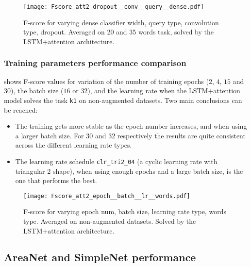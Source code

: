 \begin{figure*}[t!]
    \centering
    \texttt{[image: Fscore\_att2\_dropout\_\_conv\_\_query\_\_dense.pdf]}
    \caption{F-score for varying
        dense classifier width,
        query type,
        convolution type,
        dropout.
        Averaged on 20 and 35 words task, solved by the LSTM+attention architecture.
        }%
    \label{fig:att_dropout_conv_query_dense}
\end{figure*}

\subsubsection{Training parameters performance comparison}


 shows F-score values for 
variation of 
the number of training epochs ($2$, $4$, $15$ and $30$),
the batch size ($16$ or $32$),
and the learning rate
when the LSTM+attention model solves the task \texttt{k1}
on non-augmented datasets.
Two main conclusions can be reached:
\begin{itemize}
    \item
        The training gets more stable as the epoch number increases, and when
        using a larger batch size. For $30$ and $32$ respectively the results
        are quite consistent across the different learning rate types.
    \item
        The learning rate schedule \texttt{clr\_tri2\_04} (a cyclic learning
        rate with triangular 2 shape), when using enough epochs and a large
        batch size, is the one that performs the best.
\end{itemize}

\begin{figure*}[t!]
    \centering
    \texttt{[image: Fscore\_att2\_epoch\_\_batch\_\_lr\_\_words.pdf]}
    \caption{F-score for varying
        epoch num,
        batch size,
        learning rate type,
        words type.
        Averaged on non-augmented datasets.
        Solved by the LSTM+attention architecture.
        }%
    \label{fig:att_epoch_batch_lr_words}
\end{figure*}

\subsection{AreaNet and SimpleNet performance}

